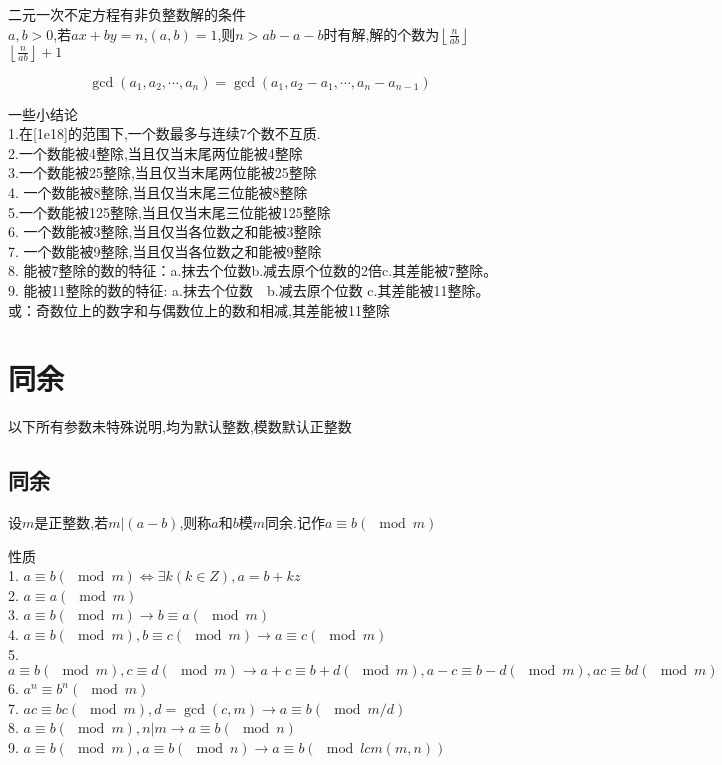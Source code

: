 \begin{corollary}
  二元一次不定方程有非负整数解的条件\\
  $a,b>0$,若$ax+by=n$,$(a,b)=1$,则$n>ab-a-b$时有解,解的个数为$\left\lfloor \frac{n}{ab} \right\rfloor$
  $\left\lfloor \frac{n}{ab} \right\rfloor+1$ 
\end{corollary}

\begin{proposition}
  $$
  \gcd(a_1,a_2,\cdots,a_n)=\gcd(a_1,a_2-a_1,\cdots,a_n-a_{n-1})
  $$
\end{proposition}

一些小结论\\
  1.在[1e18]的范围下,一个数最多与连续7个数不互质.\\
  2.一个数能被4整除,当且仅当末尾两位能被4整除\\
  3.一个数能被25整除,当且仅当末尾两位能被25整除\\
  4. 一个数能被8整除,当且仅当末尾三位能被8整除\\
  5.一个数能被125整除,当且仅当末尾三位能被125整除\\
  6. 一个数能被3整除,当且仅当各位数之和能被3整除\\
  7. 一个数能被9整除,当且仅当各位数之和能被9整除\\
  8. 能被7整除的数的特征：a.抹去个位数b.减去原个位数的2倍c.其差能被7整除。\\
  9. 能被11整除的数的特征: a.抹去个位数　b.减去原个位数 c.其差能被11整除。或：奇数位上的数字和与偶数位上的数和相减,其差能被11整除
\section{同余}
以下所有参数未特殊说明,均为默认整数,模数默认正整数\\

\subsection{同余}

\begin{definition}
  设$m$是正整数,若$m|(a-b)$,则称$a$和$b$模$m$同余.记作$a \equiv b(\mod m)$
\end{definition}

性质\\
1. $a \equiv b (\mod m) \iff \exists k (k\in Z),a=b+kz$\\
2. $a \equiv a(\mod m)$\\
3. $a \equiv b(\mod m) \rightarrow b \equiv a(\mod m)$\\
4. $a \equiv b(\mod m),b \equiv c(\mod m) \rightarrow a \equiv c(\mod m)$\\
5. $a \equiv b(\mod m),c \equiv d(\mod m)\rightarrow a+c \equiv b+d(\mod m) ,a-c \equiv b-d(\mod m),ac \equiv bd(\mod m)$\\
6. $a^n \equiv b^n(\mod m)$\\
7. $ac \equiv bc (\mod m),d=\gcd(c,m)\rightarrow a \equiv b (\mod m/d)$\\
8. $a \equiv b (\mod m),n|m \rightarrow a \equiv b (\mod n)$\\
9. $a \equiv b (\mod m),a \equiv b (\mod n)\rightarrow a \equiv b (\mod lcm(m,n))$\\


